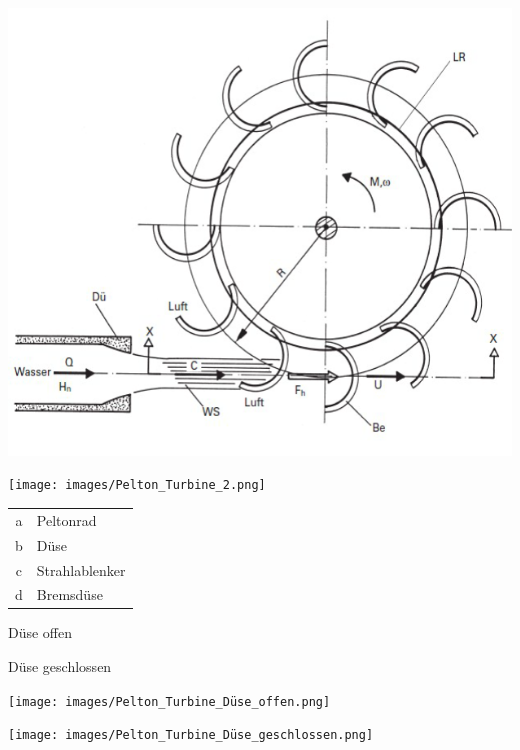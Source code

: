 \begin{minipage}[c]{0.48\columnwidth}
    \includegraphics[width=0.98\columnwidth, align=c]{images/Pelton_Turbine_1.png}    
\end{minipage}
\hfill
\begin{minipage}[c]{0.48\columnwidth}
    \texttt{[image: images/Pelton\_Turbine\_2.png]}   
\end{minipage}

\begin{tabular}{c l}
    a & Peltonrad \\
    b & Düse \\
    c & Strahlablenker \\
    d & Bremsdüse \\
\end{tabular}

\vspace{0.15cm}

\begin{minipage}[c]{0.48\columnwidth}
    Düse offen    
\end{minipage}
\hfill
\begin{minipage}[c]{0.48\columnwidth}
    Düse geschlossen   
\end{minipage}

\begin{minipage}[c]{0.48\columnwidth}
    \texttt{[image: images/Pelton\_Turbine\_Düse\_offen.png]}    
\end{minipage}
\hfill
\begin{minipage}[c]{0.48\columnwidth}
    \texttt{[image: images/Pelton\_Turbine\_Düse\_geschlossen.png]}   
\end{minipage}

